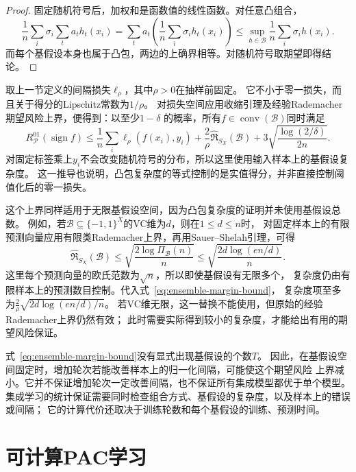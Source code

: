 \begin{proof}
固定随机符号后，加权和是函数值的线性函数。对任意凸组合，
\[
 \frac1n\sum_i\sigma_i\sum_ta_th_t(x_i)
 =\sum_ta_t\left(\frac1n\sum_i\sigma_ih_t(x_i)\right)
 \leq\sup_{h\in\mathcal B}\frac1n\sum_i\sigma_ih(x_i).
\]
而每个基假设本身也属于凸包，两边的上确界相等。对随机符号取期望即得结论。
\end{proof}

取上一节定义的间隔损失$\ell_\rho$，其中$\rho>0$在抽样前固定。
它不小于零一损失，而且关于得分的Lipschitz常数为$1/\rho$。
对损失空间应用收缩引理及经验Rademacher期望风险上界，便得到：以至少$1-\delta$
的概率，所有$f\in\operatorname{conv}(\mathcal B)$同时满足
\begin{equation}
 R_{\mathcal P}^{01}(\operatorname{sign}f)
 \leq\frac1n\sum_i\ell_\rho(f(x_i),y_i)
 +\frac{2}{\rho}\widehat{\mathfrak R}_{S_X}(\mathcal B)
 +3\sqrt{\frac{\log(2/\delta)}{2n}}.
 \label{eq:ensemble-margin-bound}
\end{equation}
对固定标签乘上$y_i$不会改变随机符号的分布，所以这里使用输入样本上的基假设复杂度。
这一推导也说明，凸包复杂度的等式控制的是实值得分，并非直接控制阈值化后的零一损失。

这个上界同样适用于无限基假设空间，因为凸包复杂度的证明并未使用基假设总数。
例如，若$\mathcal B\subseteq\{-1,1\}^X$的VC维为$d$，则在$1\leq d\leq n$时，
对固定样本上的有限预测向量应用有限类Rademacher上界，再用Sauer--Shelah引理，可得
\[
 \widehat{\mathfrak R}_{S_X}(\mathcal B)
 \leq\sqrt{\frac{2\log\Pi_{\mathcal B}(n)}{n}}
 \leq\sqrt{\frac{2d\log(en/d)}{n}}.
\]
这里每个预测向量的欧氏范数为$\sqrt n$，所以即使基假设有无限多个，
复杂度仍由有限样本上的预测数目控制。代入式~\eqref{eq:ensemble-margin-bound}，
复杂度项至多为$\frac{2}{\rho}\sqrt{2d\log(en/d)/n}$。
若VC维无限，这一替换不能使用，但原始的经验Rademacher上界仍然有效；
此时需要实际得到较小的复杂度，才能给出有用的期望风险保证。

式~\eqref{eq:ensemble-margin-bound}没有显式出现基假设的个数$T$。
因此，在基假设空间固定时，增加轮次若能改善样本上的归一化间隔，可能使这个期望风险
上界减小。它并不保证增加轮次一定改善间隔，也不保证所有集成模型都优于单个模型。
集成学习的统计保证需要同时检查组合方式、基假设的复杂度，以及样本上的错误或间隔；
它的计算代价还取决于训练轮数和每个基假设的训练、预测时间。

\section{可计算PAC学习}
\label{sec:computable-binary-learning}


